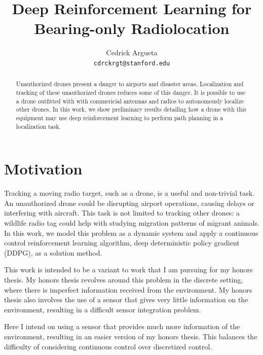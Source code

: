 \documentclass[10pt,twocolumn,letterpaper]{article}
\begin{document}
\title{Deep Reinforcement Learning for Bearing-only Radiolocation}

\author{Cedrick Argueta \\
{\tt\small cdrckrgt@stanford.edu}
}

\maketitle

\begin{abstract}
Unauthorized drones present a danger to airports and disaster areas.
Localization and tracking of these unauthorized drones reduces some of this danger.
It is possible to use a drone outfitted with with commericial antennas and radios to autonomously localize other drones.
In this work, we show preliminary results detailing how a drone with this equipment may use deep reinforcement learning to perform path planning in a localization task.
\end{abstract}

\section{Motivation}
Tracking a moving radio target, such as a drone, is a useful and non-trivial task.
An unauthorized drone could be disrupting airport operations, causing delays or interfering with aircraft.
This task is not limited to tracking other drones: a wildlife radio tag could help with studying migration patterns of migrant animals.
In this work, we model this problem as a dynamic system and apply a continuous control reinforcement learning algorithm, deep deterministic policy gradient (DDPG), as a solution method.

This work is intended to be a variant to work that I am pursuing for my honors thesis.
My honors thesis revolves around this problem in the discrete setting, where there is imperfect information received from the environment.
My honors thesis also involves the use of a sensor that gives very little information on the environment, resulting in a difficult sensor integration problem.

Here I intend on using a sensor that provides much more information of the environment, resulting in an easier version of my honors thesis.
This balances the difficulty of considering continuous control over discretized control.
\end{document}
